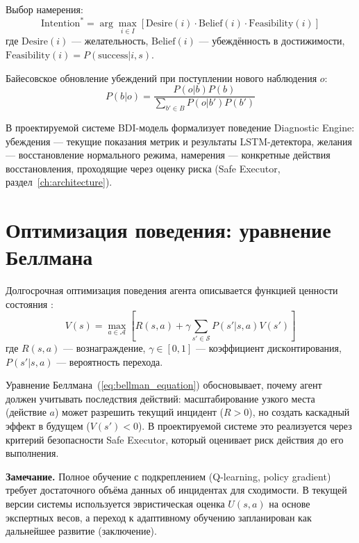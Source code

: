 Выбор намерения:
\begin{equation}
\text{Intention}^* = \arg\max_{i \in I} \left[ \text{Desire}(i) \cdot \text{Belief}(i) \cdot \text{Feasibility}(i) \right]
\label{eq:bdi_decision}
\end{equation}
где $\text{Desire}(i)$ --- желательность, $\text{Belief}(i)$ --- убеждённость в достижимости, $\text{Feasibility}(i) = P(\text{success}|i, s)$.

Байесовское обновление убеждений при поступлении нового наблюдения $o$:
\begin{equation}
P(b|o) = \frac{P(o|b) P(b)}{\sum_{b' \in B} P(o|b') P(b')}
\label{eq:belief_update}
\end{equation}

В проектируемой системе BDI-модель формализует поведение Diagnostic Engine: убеждения --- текущие показания метрик и результаты LSTM-детектора, желания --- восстановление нормального режима, намерения --- конкретные действия восстановления, проходящие через оценку риска (Safe Executor, раздел~\ref{ch:architecture}).

\section{Оптимизация поведения: уравнение Беллмана}

Долгосрочная оптимизация поведения агента описывается функцией ценности состояния \cite{sutton_reinforcement_learning}:
\begin{equation}
V(s) = \max_{a \in \mathcal{A}} \left[ R(s, a) + \gamma \sum_{s' \in \mathcal{S}} P(s'|s, a) V(s') \right]
\label{eq:bellman_equation}
\end{equation}
где $R(s, a)$ --- вознаграждение, $\gamma \in [0, 1]$ --- коэффициент дисконтирования, $P(s'|s, a)$ --- вероятность перехода.

Уравнение Беллмана~(\ref{eq:bellman_equation}) обосновывает, почему агент должен учитывать последствия действий: масштабирование узкого места (действие $a$) может разрешить текущий инцидент ($R > 0$), но создать каскадный эффект в будущем ($V(s') < 0$). В проектируемой системе это реализуется через критерий безопасности Safe Executor, который оценивает риск действия до его выполнения.

\textbf{Замечание.} Полное обучение с подкреплением (Q-learning, policy gradient) требует достаточного объёма данных об инцидентах для сходимости. В текущей версии системы используется эвристическая оценка $U(s, a)$ на основе экспертных весов, а переход к адаптивному обучению запланирован как дальнейшее развитие (заключение).

